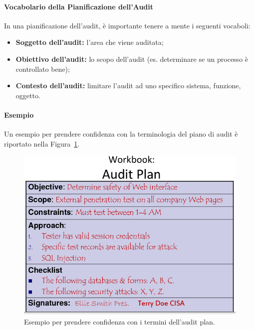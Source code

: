 \paragraph{Vocabolario della Pianificazione dell'Audit}

In una pianificazione dell'audit, è importante tenere a mente i seguenti
vocaboli:
\begin{itemize}
\item \textbf{Soggetto dell'audit:} l'area che viene auditata;
\item \textbf{Obiettivo dell'audit:} lo scopo dell'audit (es. determinare se un
processo è controllato bene);
\item \textbf{Contesto dell'audit:} limitare l'audit ad uno specifico sistema,
funzione, oggetto.
\end{itemize}


\paragraph*{Esempio}
Un esempio per prendere confidenza con la terminologia del piano
di audit è riportato nella Figura~\ref{fig:audit:plan:vocabulary:example}.

\begin{figure}[H]
	\begin{center}
\includegraphics[scale=0.3]{res/img/audit_plan_vocabulary_example.png}
	\end{center}
	\caption{Esempio per prendere confidenza con i termini dell'audit plan.}
	\label{fig:audit:plan:vocabulary:example}
\end{figure}

